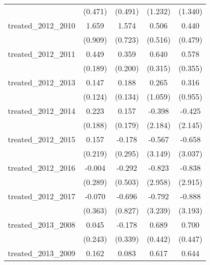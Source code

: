 {\begin{tabular}{l*{4}{c}}
            &     (0.471)         &     (0.491)         &     (1.232)         &     (1.340)         \\
[1em]
treated\_2012\_2010&       1.659         &       1.574\sym{*}  &       0.506         &       0.440         \\
            &     (0.909)         &     (0.723)         &     (0.516)         &     (0.479)         \\
[1em]
treated\_2012\_2011&       0.449\sym{*}  &       0.359         &       0.640\sym{*}  &       0.578         \\
            &     (0.189)         &     (0.200)         &     (0.315)         &     (0.355)         \\
[1em]
treated\_2012\_2013&       0.147         &       0.188         &       0.265         &       0.316         \\
            &     (0.124)         &     (0.134)         &     (1.059)         &     (0.955)         \\
[1em]
treated\_2012\_2014&       0.223         &       0.157         &      -0.398         &      -0.425         \\
            &     (0.188)         &     (0.179)         &     (2.184)         &     (2.145)         \\
[1em]
treated\_2012\_2015&       0.157         &      -0.178         &      -0.567         &      -0.658         \\
            &     (0.219)         &     (0.295)         &     (3.149)         &     (3.037)         \\
[1em]
treated\_2012\_2016&      -0.004         &      -0.292         &      -0.823         &      -0.838         \\
            &     (0.289)         &     (0.503)         &     (2.958)         &     (2.915)         \\
[1em]
treated\_2012\_2017&      -0.070         &      -0.696         &      -0.792         &      -0.888         \\
            &     (0.363)         &     (0.827)         &     (3.239)         &     (3.193)         \\
[1em]
treated\_2013\_2008&       0.045         &      -0.178         &       0.689         &       0.700         \\
            &     (0.243)         &     (0.339)         &     (0.442)         &     (0.447)         \\
[1em]
treated\_2013\_2009&       0.162         &       0.083         &       0.617\sym{*}  &       0.644\sym{*}  \\

\end{tabular}}
